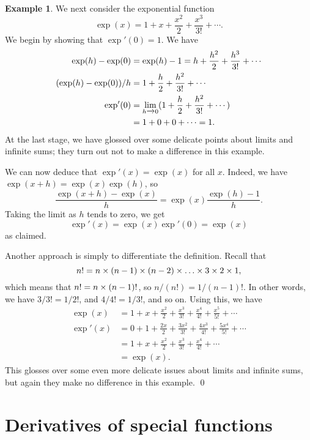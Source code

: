 \documentclass[a4paper]{book}
\theoremstyle{definition}
\newtheorem{example}[theorem]{Example}
\begin{document}
\begin{example}
 We next consider the exponential function
 \[ \exp(x) = 1 + x + \frac{x^2}{2} + \frac{x^3}{3!} + \cdots. \]
 We begin by showing that $\exp'(0)=1$.  We have
 \begin{align*}
  \exp(h) - \exp(0) &= \exp(h) - 1 =
   h + \frac{h^2}{2} + \frac{h^3}{3!} + \cdots \\
  (\exp(h)-\exp(0))/h &= 
   1 + \frac{h}{2} + \frac{h^2}{3!} + \cdots \\
  \exp'(0) &=
   \lim_{h\xrightarrow{}0}(1 + \frac{h}{2} + \frac{h^2}{3!} + \cdots) \\
    &= 1 + 0 + 0 + \cdots = 1.
 \end{align*}
 At the last stage, we have glossed over some delicate points about
 limits and infinite sums; they turn out not to make a difference in
 this example.  

 We can now deduce that $\exp'(x)=\exp(x)$ for all $x$.  Indeed, we
 have $\exp(x+h)=\exp(x)\exp(h)$, so 
 \[ \frac{\exp(x+h)-\exp(x)}{h} = \exp(x) \frac{\exp(h)-1}{h}. \]
 Taking the limit as $h$ tends to zero, we get
 \[ \exp'(x) = \exp(x)\exp'(0) = \exp(x) \]
 as claimed.

 Another approach is simply to differentiate the definition.  Recall
 that 
 \[ n! = n\times(n-1)\times(n-2)\times\ldots\times 3\times 2\times 1, \]
 which means that $n!=n\times (n-1)!$, so $n/(n!)=1/(n-1)!$.  In other
 words, we have $3/3!=1/2!$, and $4/4!=1/3!$, and so on.  Using this,
 we have
 \begin{align*}
  \exp(x)  &= 1 + x + \frac{x^2}{2} + \frac{x^3}{3!} + 
              \frac{x^4}{4!} + \frac{x^5}{5!} + \cdots \\
  \exp'(x) &= 0 + 1 + \frac{2x}{2} + \frac{3x^2}{3!} + 
              \frac{4x^3}{4!} + \frac{5x^4}{5!} + \cdots \\
           &= 1 + x + \frac{x^2}{2} + \frac{x^3}{3!} + 
              \frac{x^4}{4!} + \cdots \\
           &= \exp(x).
 \end{align*}
 This glosses over some even more delicate issues about limits and
 infinite sums, but again they make no difference in this example. \qed
\end{example}

\section{Derivatives of special functions}
\label{sec-diff-spec}
\end{document}
